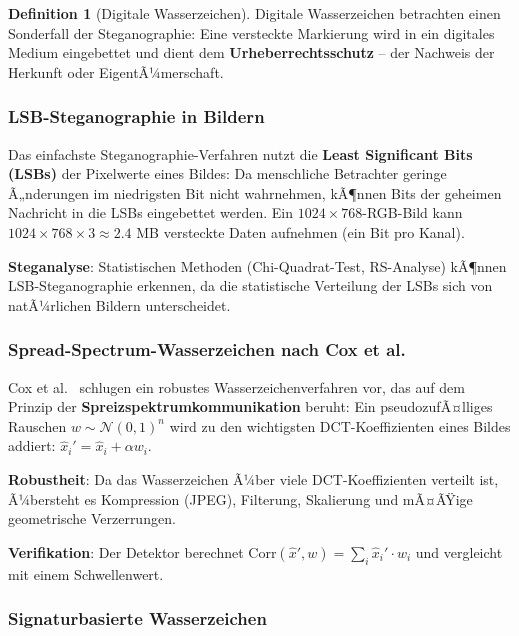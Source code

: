 ﻿\documentclass[a4paper,12pt]{scrreprt}
\theoremstyle{definition}
\newtheorem{definition}{Definition}[section]
\begin{document}
\begin{definition}[Digitale Wasserzeichen]
Digitale Wasserzeichen \cite{Cox97} betrachten einen Sonderfall der Steganographie: Eine versteckte Markierung wird in ein digitales Medium eingebettet und dient dem \textbf{Urheberrechtsschutz} -- der Nachweis der Herkunft oder EigentÃ¼merschaft.
\end{definition}

\subsubsection{LSB-Steganographie in Bildern}

Das einfachste Steganographie-Verfahren nutzt die \textbf{Least Significant Bits (LSBs)} der Pixelwerte eines Bildes: Da menschliche Betrachter geringe Ã„nderungen im niedrigsten Bit nicht wahrnehmen, kÃ¶nnen Bits der geheimen Nachricht in die LSBs eingebettet werden. Ein $1024\times768$-RGB-Bild kann $1024 \times 768 \times 3 \approx 2.4$ MB versteckte Daten aufnehmen (ein Bit pro Kanal).

\textbf{Steganalyse}: Statistischen Methoden (Chi-Quadrat-Test, RS-Analyse) kÃ¶nnen LSB-Steganographie erkennen, da die statistische Verteilung der LSBs sich von natÃ¼rlichen Bildern unterscheidet.

\subsubsection{Spread-Spectrum-Wasserzeichen nach Cox et al.}

Cox et al.\ \cite{Cox97} schlugen ein robustes Wasserzeichenverfahren vor, das auf dem Prinzip der \textbf{Spreizspektrumkommunikation} beruht: Ein pseudozufÃ¤lliges Rauschen $w \sim \mathcal{N}(0,1)^n$ wird zu den wichtigsten DCT-Koeffizienten eines Bildes addiert: $\hat{x}_i' = \hat{x}_i + \alpha w_i$.

\textbf{Robustheit}: Da das Wasserzeichen Ã¼ber viele DCT-Koeffizienten verteilt ist, Ã¼bersteht es Kompression (JPEG), Filterung, Skalierung und mÃ¤ÃŸige geometrische Verzerrungen.

\textbf{Verifikation}: Der Detektor berechnet $\mathrm{Corr}(\hat{x}', w) = \sum_i \hat{x}_i' \cdot w_i$ und vergleicht mit einem Schwellenwert.

\subsubsection{Signaturbasierte Wasserzeichen}
\end{document}
